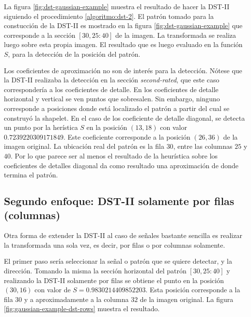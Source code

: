 La figura \ref{fig:dst-gaussian-example} muestra el resultado de hacer la DST-II siguiendo el procedimiento \ref{algoritmo:dst-2}.
El patrón tomado para la constucción de la DST-II es mostrado en la figura \ref{fig:dst-gaussian-example} que corresponde
a la sección $[30, 25:40]$ de la imagen. La transformada se realiza luego sobre esta propia imagen. El resultado que
es luego evaluado en la función $S$, para la detección de la posición del patrón.

Los coeficientes de aproximación no son de interés para la detección. Nótese que la DST-II realizaba la detección en la sección
\textit{second-rated}, que este caso correspondería a los coeficientes de detalle. En los coeficientes de detalle horizontal 
y vertical se ven puntos que sobresalen. Sin embargo, ninguno corresponde a posiciones donde está localizado el patrón 
a partir del cual se construyó la shapelet. En el caso de los coeficiente de detalle diagonal, se detecta un punto por la
herística $S$ en la posición $(13,18)$ con valor $0.7239220309171849$. Este coeficiente corresponde a la posición
$(26,36)$ de la imagen original. La ubicación real del patrón es la fila $30$, entre las columnas $25$ y $40$. Por lo que
parece ser al menos el resultado de la heurística sobre los coeficientes de detalles diagonal da como resultado una 
aproximación de donde termina el patrón. 


\subsection{Segundo enfoque: DST-II solamente por filas (columnas)}

Otra forma de extender la DST-II al caso de señales bastante sencilla  es realizar la transformada 
una sola vez, es decir, por filas o por columnas solamente.

El primer paso sería seleccionar la señal o patrón que se quiere detectar, y la dirección.
Tomando la misma la sección horizontal del patrón $[30, 25:40]$ y realizando la DST-II solamente por filas 
se obtiene el punto en la posición $(30, 16)$ con valor de $S=0.9830214409852203$. Esta posición corresponde 
a la fila $30$ y a aproximadamente a la columna $32$ de la imagen original. La figura
\ref{fig:gaussian-example-dst-rows} muestra el resultado.

